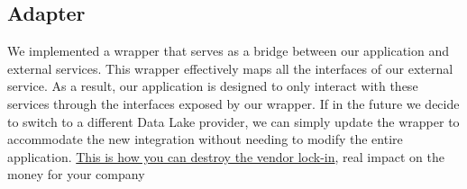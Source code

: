 \subsection{Adapter}
We implemented a wrapper that serves as a bridge between our application and external services. This wrapper effectively maps all the interfaces of our external service. As a result, our application is designed to only interact with these services through the interfaces exposed by our wrapper. If in the future we decide to switch to a different Data Lake provider, we can simply update the wrapper to accommodate the new integration without needing to modify the entire application. \uline{This is how you can destroy the vendor lock-in}, real impact on the money for your company

\newpage